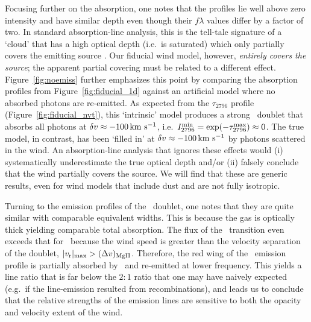 \documentclass[12pt,preprint]{aastex}
\begin{document}
Focusing further on the  absorption, one notes that the profiles lie
well above zero intensity and have similar depth even though their $f\lambda$
values differ by a factor of two.  In standard absorption-line
analysis, this is 
the tell-tale signature of a `cloud' that has a high optical depth (i.e.\
is saturated) which only partially covers the emitting source
\citep[e.g.][]{rvs05a,hkp+10}.  Our fiducial wind model, however, 
{\it entirely covers the source}; the apparent partial covering must
be related to a different effect.
Figure~\ref{fig:noemiss} further emphasizes this point by comparing the 
absorption profiles from Figure~\ref{fig:fiducial_1d} against an
artificial model where no absorbed photons are 
re-emitted.   As expected from the
$\tau_{2796}$ profile (Figure~\ref{fig:fiducial_nvt}), this
`intrinsic' model
produces a strong \mgiid\ doublet that absorbs all photons at
$\delta v \approx -100 \, {\rm km~s^{-1}}$, i.e.\ $I_{2796}^{\rm min} = \exp(-\tau^{\rm
  max}_{2796}) \approx 0$.
The true model, in contrast, has been `filled in' at $\delta v \approx -100
\, {\rm km~s^{-1}}$ by photons scattered in the wind.  An
absorption-line analysis that ignores these effects
would (i) systematically underestimate the true optical
depth and/or (ii) falsely conclude that the wind partially covers the
source.  We will find that these are
generic results, even for wind models that include
dust and are not fully isotropic.

Turning to the emission profiles of the \mgiid\ doublet, one notes
that they are quite similar with comparable equivalent widths.
This is because the gas is optically
thick yielding comparable total absorption. The
flux of the \mgiib\ transition even exceeds that for \mgiia\ 
because the wind speed is greater than the velocity separation
of the doublet, $|v_{\rm r}|_{\rm max} > (\Delta v)_{\rm MgII}$.
Therefore, the red wing of the
\mgiia\ emission profile is partially absorbed by \mgiib\ and
re-emitted at lower frequency.
This yields a
line ratio that is far below the $2:1$ ratio that one may have naively
expected (e.g.\ if the line-emission resulted from recombinations),
and leads us to conclude that the relative 
strengths of the emission lines are sensitive to both the opacity and
velocity extent of the wind. 
\end{document}

